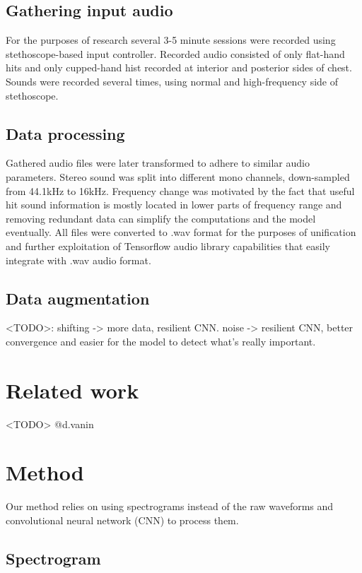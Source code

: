 \documentclass[conference]{IEEEtran}
\begin{document}
\subsection{Gathering input audio}
For the purposes of research several 3-5 minute sessions were recorded using stethoscope-based input controller. Recorded audio consisted of only flat-hand hits and only cupped-hand hist recorded at interior and posterior sides of chest. Sounds were recorded several times, using normal and high-frequency side of stethoscope. 

\subsection{Data processing}

Gathered audio files were later transformed to adhere to similar audio parameters. Stereo sound was split into different mono channels, down-sampled from 44.1kHz to 16kHz. Frequency change was motivated by the fact that useful hit sound information is mostly located in lower parts of frequency range and removing redundant data can simplify the computations and the model eventually. All files were converted to .wav format for the purposes of unification and further exploitation of Tensorflow audio library capabilities that easily integrate with .wav audio format.

\subsection{Data augmentation}
<TODO>: shifting -> more data, resilient CNN. noise -> resilient CNN, better convergence and easier for the model to detect what's really important.

\section{Related work}
<TODO> @d.vanin

\section{Method}

Our method relies on using spectrograms instead of the raw waveforms and convolutional neural network (CNN) to process them.

\subsection{Spectrogram}
\end{document}
